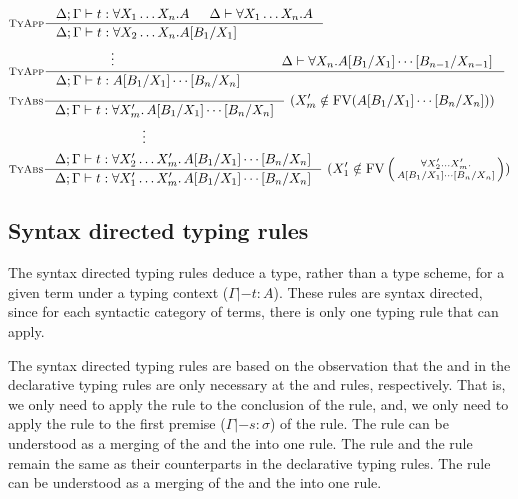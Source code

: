 {\small
\begin{align*}
& \inference[\sc TyApp]
        {\Delta;\Gamma |- t : \forall X_1\dots X_n.A & \Delta |- \forall X_1\dots X_n.A}
        {\Delta;\Gamma |- t : \forall X_2\dots X_n.A[B_1/X_1]
        \qquad\qquad\quad~~} \\
& \inference[\sc TyApp]
        { \qquad\qquad \vdots \qquad\qquad\qquad\qquad\qquad \quad
        & \Delta |- \forall X_n.A[B_1/X_1]\cdots[B_{n-1}/X_{n-1}]
        }
        { \Delta;\Gamma |- t : A[B_1/X_1]\cdots[B_n/X_n] \qquad \qquad
         \qquad\qquad\qquad\qquad\qquad\qquad\qquad\quad
        } \\
& \inference[\sc TyAbs]
        {}
        {\Delta;\Gamma |- t : \forall X_m'.\,A[B_1/X_1]\cdots[B_n/X_n]} ~
        (X_m'\notin\FV(A[B_1/X_1]\cdots[B_n/X_n])) \\
& \qquad\qquad\qquad\qquad\qquad \vdots \\
& \inference[\sc TyAbs]
        {\Delta;\Gamma |- t : \forall X_2'\dots X_m'.\,A[B_1/X_1]\cdots[B_n/X_n]}
        {\Delta;\Gamma |- t : \forall X_1'\dots X_m'.\,A[B_1/X_1]\cdots[B_n/X_n]} ~
        (X_1'\notin\FV\left(\begin{smallmatrix}\forall X_2'\dots X_m'.\\A[B_1/X_1]\cdots[B_n/X_n]\end{smallmatrix}\right))
\end{align*}
} %

\subsection{Syntax directed typing rules}\label{sec:hm:syntyrule}
The syntax directed typing rules \cite{Clement86} deduce a type,
rather than a type scheme, for a given term under a typing context
($\Gamma |- t : A$). These rules are syntax directed, since 
for each syntactic category of terms, there is only one typing rule that can apply.

The syntax directed typing rules are based on the observation
that the  and  in the declarative typing rules
are only necessary at the  and  rules, respectively.
That is, we only need to apply the  rule to the conclusion of
the  rule, and, we only need to apply the  rule to
the first premise ($\Gamma |- s:\sigma$) of the  rule.
The  rule can be understood as a merging of the
 and the  into one rule.
The  rule and the  rule remain the same as
their counterparts in the declarative typing rules.
The  rule can be understood as a merging of
the  and the  into one rule.

